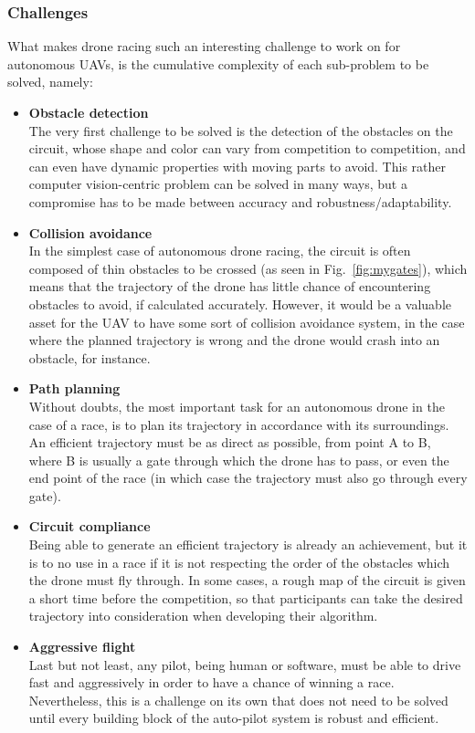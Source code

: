 \subsubsection{Challenges}

What makes drone racing such an interesting challenge to work on for autonomous
UAVs, is the cumulative complexity of each sub-problem to be solved, namely:

\begin{itemize}
	\item{\textbf{Obstacle detection\\}
		The very first challenge to be solved is the detection of the obstacles
		on the circuit, whose shape and color can vary from competition to
		competition, and can even have dynamic properties with moving parts to
		avoid. This rather computer vision-centric problem can be solved
		in many ways, but a compromise has to be made between accuracy and
		robustness/adaptability.
	}
	\item{\textbf{Collision avoidance\\}
		In the simplest case of autonomous drone racing, the circuit is often
		composed of thin obstacles to be crossed (as seen in
		Fig.~\ref{fig:mygates}), which means that the trajectory of the drone
		has little chance of encountering obstacles to avoid, if calculated
		accurately. However, it would be a valuable asset for the UAV to have
		some sort of collision avoidance system, in the case where the planned
		trajectory is wrong and the drone would crash into an obstacle, for
		instance.
	}
	\item{\textbf{Path planning\\}
		Without doubts, the most important task for an autonomous drone in the
		case of a race, is to plan its trajectory in accordance with its
		surroundings. An efficient trajectory must be as direct as possible,
		from point A to B, where B is usually a gate through which the drone
		has to pass, or even the end point of the race (in which case the
		trajectory must also go through every gate).
	}
	\item{\textbf{Circuit compliance\\}
		Being able to generate an efficient trajectory is already an
		achievement, but it is to no use in a race if it is not respecting the
		order of the obstacles which the drone must fly through. In some cases,
		a rough map of the circuit is given a short time before the
		competition, so that participants can take the desired trajectory into
		consideration when developing their algorithm.
	}
	\item{\textbf{Aggressive flight\\}
		Last but not least, any pilot, being human or software, must be able to
		drive fast and aggressively in order to have a chance of winning a
		race.  Nevertheless, this is a challenge on its own that does not need
		to be solved until every building block of the auto-pilot system is
		robust and efficient.\\
	}
\end{itemize}

